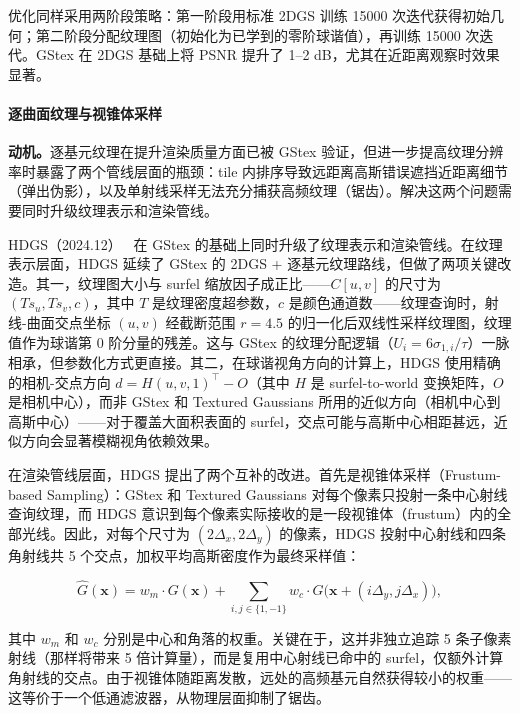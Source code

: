 优化同样采用两阶段策略：第一阶段用标准 2DGS 训练 15000 次迭代获得初始几何；第二阶段分配纹理图（初始化为已学到的零阶球谐值），再训练 15000 次迭代。GStex 在 2DGS 基础上将 PSNR 提升了 1--2 dB，尤其在近距离观察时效果显著。

\paragraph{逐曲面纹理与视锥体采样}

\textbf{动机。}逐基元纹理在提升渲染质量方面已被 GStex 验证，但进一步提高纹理分辨率时暴露了两个管线层面的瓶颈：tile 内排序导致远距离高斯错误遮挡近距离细节（弹出伪影），以及单射线采样无法充分捕获高频纹理（锯齿）。解决这两个问题需要同时升级纹理表示和渲染管线。

HDGS（2024.12）~\cite{2412_01823} 在 GStex 的基础上同时升级了纹理表示和渲染管线。在纹理表示层面，HDGS 延续了 GStex 的 2DGS + 逐基元纹理路线，但做了两项关键改造。其一，纹理图大小与 surfel 缩放因子成正比——$C[u,v]$ 的尺寸为 $(Ts_u, Ts_v, c)$，其中 $T$ 是纹理密度超参数，$c$ 是颜色通道数——纹理查询时，射线-曲面交点坐标 $(u,v)$ 经截断范围 $r=4.5$ 的归一化后双线性采样纹理图，纹理值作为球谐第 0 阶分量的残差。这与 GStex 的纹理分配逻辑（$U_i = 6\sigma_{1,i}/\tau$）一脉相承，但参数化方式更直接。其二，在球谐视角方向的计算上，HDGS 使用精确的相机-交点方向 $d = H(u,v,1)^\top - O$（其中 $H$ 是 surfel-to-world 变换矩阵，$O$ 是相机中心），而非 GStex 和 Textured Gaussians 所用的近似方向（相机中心到高斯中心）——对于覆盖大面积表面的 surfel，交点可能与高斯中心相距甚远，近似方向会显著模糊视角依赖效果。

在渲染管线层面，HDGS 提出了两个互补的改进。首先是视锥体采样（Frustum-based Sampling）：GStex 和 Textured Gaussians 对每个像素只投射一条中心射线查询纹理，而 HDGS 意识到每个像素实际接收的是一段视锥体（frustum）内的全部光线。因此，对每个尺寸为 $(2\Delta_x, 2\Delta_y)$ 的像素，HDGS 投射中心射线和四条角射线共 5 个交点，加权平均高斯密度作为最终采样值：

\begin{equation}
    \hat{G}(\mathbf{x}) = w_m \cdot G(\mathbf{x}) + \sum_{i,j \in \{1,-1\}} w_c \cdot G\bigl(\mathbf{x} + (i\Delta_y, j\Delta_x)\bigr),
\end{equation}

其中 $w_m$ 和 $w_c$ 分别是中心和角落的权重。关键在于，这并非独立追踪 5 条子像素射线（那样将带来 5 倍计算量），而是复用中心射线已命中的 surfel，仅额外计算角射线的交点。由于视锥体随距离发散，远处的高频基元自然获得较小的权重——这等价于一个低通滤波器，从物理层面抑制了锯齿。

